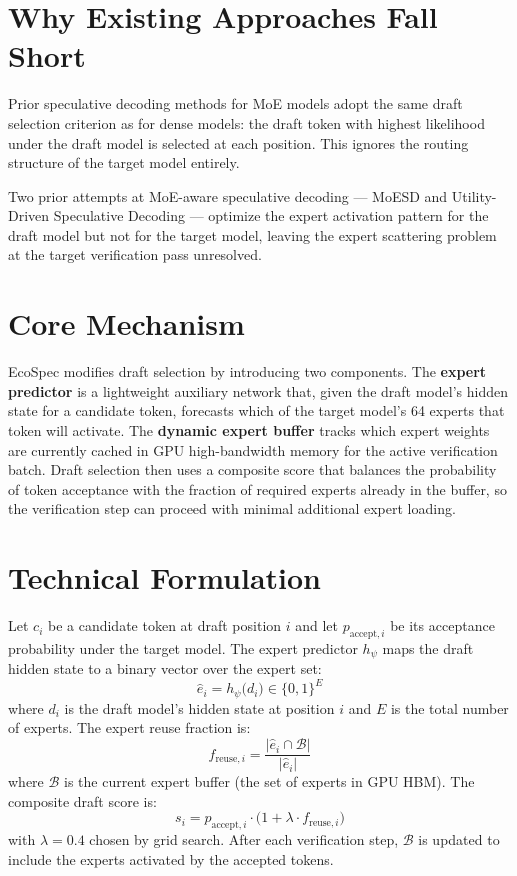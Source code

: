\documentclass[10pt,twocolumn]{article}
\begin{document}
\section{Why Existing Approaches Fall Short}

Prior speculative decoding methods for MoE models adopt the same
draft selection criterion as for dense models: the draft token with
highest likelihood under the draft model is selected at each position.
This ignores the routing structure of the target model entirely.

Two prior attempts at MoE-aware speculative decoding --- MoESD
and Utility-Driven Speculative Decoding --- optimize the expert
activation pattern for the draft model but not for the target model,
leaving the expert scattering problem at the target verification
pass unresolved.

\section{Core Mechanism}

EcoSpec modifies draft selection by introducing two components.
The \textbf{expert predictor} is a lightweight auxiliary network
that, given the draft model's hidden state for a candidate token,
forecasts which of the target model's 64 experts that token will
activate.
The \textbf{dynamic expert buffer} tracks which expert weights are
currently cached in GPU high-bandwidth memory for the active
verification batch.
Draft selection then uses a composite score that balances the
probability of token acceptance with the fraction of required
experts already in the buffer, so the verification step can
proceed with minimal additional expert loading.

\section{Technical Formulation}

Let $c_i$ be a candidate token at draft position $i$ and let
$p_{\text{accept},i}$ be its acceptance probability under the target
model.
The expert predictor $h_\psi$ maps the draft hidden state to a
binary vector over the expert set:
\[
\hat{e}_i = h_\psi\bigl(d_i\bigr) \in \{0,1\}^E
\]
where $d_i$ is the draft model's hidden state at position $i$
and $E$ is the total number of experts.
The expert reuse fraction is:
\[
f_{\text{reuse},i}
  = \frac{\lvert \hat{e}_i \cap \mathcal{B} \rvert}{\lvert \hat{e}_i \rvert}
\]
where $\mathcal{B}$ is the current expert buffer (the set of
experts in GPU HBM).
The composite draft score is:
\[
s_i = p_{\text{accept},i} \cdot \bigl(1 + \lambda \cdot f_{\text{reuse},i}\bigr)
\]
with $\lambda = 0.4$ chosen by grid search.
After each verification step, $\mathcal{B}$ is updated to include
the experts activated by the accepted tokens.
\end{document}
